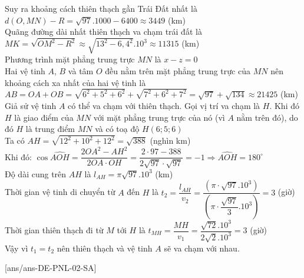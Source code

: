\begin{ex}
{\begin{itemchoice}
			Suy ra khoảng cách thiên thạch gần Trái Đất nhất là $d(O,MN)-R=\sqrt{97}.1000-6400\approx 3449$ (km)\\
			\itemch Quãng đường dài nhất thiên thạch va chạm trái đất là $MK=\sqrt{OM^2-R^2} \approx \sqrt{13^2-6,4^2}.10^3\approx 11315$ (km)\\
			\itemch Phương trình mặt phẳng trung trực $MN$ là $x-z=0$\\
			Hai vệ tinh $A$, $B$ và tâm $O$ đều nằm trên mặt phẳng trung trực của $MN$ nên khoảng cách xa nhất của hai vệ tinh là $AB=OA+OB=\sqrt{6^2+5^2+6^2}+\sqrt{7^2+6^2+7^2}=\sqrt{97}+\sqrt{134}\approx 21425$ (km)\\
			\itemch Giả sử vệ tinh $A$ có thể va chạm với thiên thạch. Gọi vị trí va chạm là $H$. Khi đó $H$ là giao điểm của $MN$ với mặt phẳng trung trực của nó (vì $A$ nằm trên đó), do đó $H$ là trung điểm $MN$ và có toạ độ $H\left(6;5;6\right)$\\
			Ta có $AH=\sqrt{12^2+10^2+12^2}=\sqrt{388}$ (nghìn km)\\
			Khi đó: $\cos\widehat{AOH}=\dfrac{2OA^2-AH^2}{2OA \cdot OH}=\dfrac{2 \cdot 97-388}{2\sqrt{97} \cdot \sqrt{97}}=-1\Rightarrow\widehat{AOH}=180^\circ$\\
			Độ dài cung trên $AH$ là $l_{AH}=\pi\sqrt{97}.10^3$ (km)\\
			Thời gian vệ tinh di chuyển từ $A$ đến $H$ là $t_2=\dfrac{l_{AH}}{v_2}=\dfrac{\left(\pi \cdot \sqrt{97}.10^3\right)}{\left(\pi \cdot \dfrac{\sqrt{97}}{3}.10^3\right)}=3$ (giờ)\\
			Thời gian thiên thạch đi từ $M$ tới $H$ là $t_{MH}=\dfrac{MH}{v_1}=\dfrac{\sqrt{72}.10^3}{2\sqrt{2}.10^3}=3$ (giờ)\\
			Vậy vì $t_1=t_2$ nên thiên thạch và vệ tinh $A$ sẽ va chạm với nhau.
		\end{itemchoice}
	}
\end{ex}
\TNSA
{}[ans/ans-DE-PNL-02-SA]
